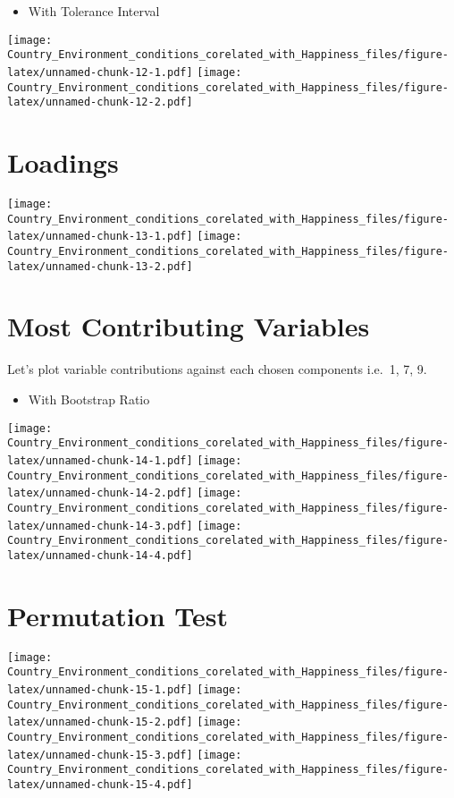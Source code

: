\documentclass[]{book}
\providecommand{\tightlist}{%
  \setlength{\itemsep}{0pt}\setlength{\parskip}{0pt}}
\begin{document}
\begin{itemize}
\tightlist
\item
  With Tolerance Interval
\end{itemize}

\texttt{[image: Country\_Environment\_conditions\_corelated\_with\_Happiness\_files/figure-latex/unnamed-chunk-12-1.pdf]}
\texttt{[image: Country\_Environment\_conditions\_corelated\_with\_Happiness\_files/figure-latex/unnamed-chunk-12-2.pdf]}

\hypertarget{loadings}{%
\section{Loadings}\label{loadings}}

\texttt{[image: Country\_Environment\_conditions\_corelated\_with\_Happiness\_files/figure-latex/unnamed-chunk-13-1.pdf]}
\texttt{[image: Country\_Environment\_conditions\_corelated\_with\_Happiness\_files/figure-latex/unnamed-chunk-13-2.pdf]}

\hypertarget{most-contributing-variables}{%
\section{Most Contributing
Variables}\label{most-contributing-variables}}

Let's plot variable contributions against each chosen components i.e.~1,
7, 9.

\begin{itemize}
\tightlist
\item
  With Bootstrap Ratio
\end{itemize}

\texttt{[image: Country\_Environment\_conditions\_corelated\_with\_Happiness\_files/figure-latex/unnamed-chunk-14-1.pdf]}
\texttt{[image: Country\_Environment\_conditions\_corelated\_with\_Happiness\_files/figure-latex/unnamed-chunk-14-2.pdf]}
\texttt{[image: Country\_Environment\_conditions\_corelated\_with\_Happiness\_files/figure-latex/unnamed-chunk-14-3.pdf]}
\texttt{[image: Country\_Environment\_conditions\_corelated\_with\_Happiness\_files/figure-latex/unnamed-chunk-14-4.pdf]}

\hypertarget{permutation-test}{%
\section{Permutation Test}\label{permutation-test}}

\texttt{[image: Country\_Environment\_conditions\_corelated\_with\_Happiness\_files/figure-latex/unnamed-chunk-15-1.pdf]}
\texttt{[image: Country\_Environment\_conditions\_corelated\_with\_Happiness\_files/figure-latex/unnamed-chunk-15-2.pdf]}
\texttt{[image: Country\_Environment\_conditions\_corelated\_with\_Happiness\_files/figure-latex/unnamed-chunk-15-3.pdf]}
\texttt{[image: Country\_Environment\_conditions\_corelated\_with\_Happiness\_files/figure-latex/unnamed-chunk-15-4.pdf]}
\end{document}

